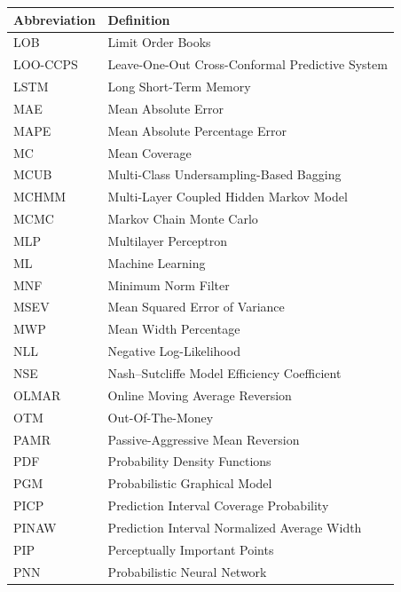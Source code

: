 \begin{table}[H]
\begin{subtable}[t]{0.49\textwidth}
\begin{tabular}{lp{}}
        \bottomrule
        \end{tabular}
    \end{subtable}
    \hfill
    \begin{subtable}[t]{0.49\textwidth}
        \centering
        \begin{tabular}{lp{}}
        \toprule
        \textbf{Abbreviation} & \textbf{Definition} \\
        \midrule
        LOB & Limit Order Books \\
        LOO-CCPS & Leave-One-Out Cross-Conformal Predictive System \\
        LSTM & Long Short-Term Memory \\
        MAE & Mean Absolute Error \\
        MAPE & Mean Absolute Percentage Error \\
        MC & Mean Coverage \\
        MCUB & Multi-Class Undersampling-Based Bagging \\
        MCHMM & Multi-Layer Coupled Hidden Markov Model \\
        MCMC & Markov Chain Monte Carlo \\
        MLP & Multilayer Perceptron \\
        ML & Machine Learning \\
        MNF & Minimum Norm Filter \\
        MSEV & Mean Squared Error of Variance \\
        MWP & Mean Width Percentage \\
        NLL & Negative Log-Likelihood \\
        NSE & Nash–Sutcliffe Model Efficiency Coefficient \\
        OLMAR & Online Moving Average Reversion \\
        OTM & Out-Of-The-Money \\
        PAMR & Passive-Aggressive Mean Reversion \\
        PDF & Probability Density Functions \\
        PGM & Probabilistic Graphical Model \\
        PICP & Prediction Interval Coverage Probability \\
        PINAW & Prediction Interval Normalized Average Width \\
        PIP & Perceptually Important Points \\
        PNN & Probabilistic Neural Network \\

\end{tabular}
\end{subtable}
\end{table}
